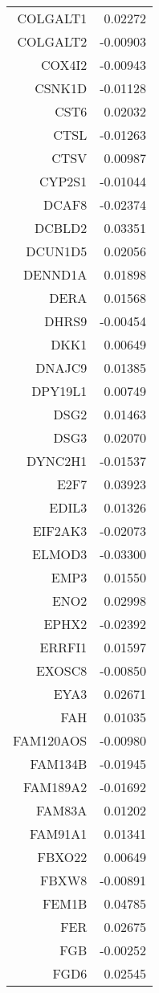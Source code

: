 \begin{longtable}{rr}
  COLGALT1 & 0.02272 \\ 
  COLGALT2 & -0.00903 \\ 
  COX4I2 & -0.00943 \\ 
  CSNK1D & -0.01128 \\ 
  CST6 & 0.02032 \\ 
  CTSL & -0.01263 \\ 
  CTSV & 0.00987 \\ 
  CYP2S1 & -0.01044 \\ 
  DCAF8 & -0.02374 \\ 
  DCBLD2 & 0.03351 \\ 
  DCUN1D5 & 0.02056 \\ 
  DENND1A & 0.01898 \\ 
  DERA & 0.01568 \\ 
  DHRS9 & -0.00454 \\ 
  DKK1 & 0.00649 \\ 
  DNAJC9 & 0.01385 \\ 
  DPY19L1 & 0.00749 \\ 
  DSG2 & 0.01463 \\ 
  DSG3 & 0.02070 \\ 
  DYNC2H1 & -0.01537 \\ 
  E2F7 & 0.03923 \\ 
  EDIL3 & 0.01326 \\ 
  EIF2AK3 & -0.02073 \\ 
  ELMOD3 & -0.03300 \\ 
  EMP3 & 0.01550 \\ 
  ENO2 & 0.02998 \\ 
  EPHX2 & -0.02392 \\ 
  ERRFI1 & 0.01597 \\ 
  EXOSC8 & -0.00850 \\ 
  EYA3 & 0.02671 \\ 
  FAH & 0.01035 \\ 
  FAM120AOS & -0.00980 \\ 
  FAM134B & -0.01945 \\ 
  FAM189A2 & -0.01692 \\ 
  FAM83A & 0.01202 \\ 
  FAM91A1 & 0.01341 \\ 
  FBXO22 & 0.00649 \\ 
  FBXW8 & -0.00891 \\ 
  FEM1B & 0.04785 \\ 
  FER & 0.02675 \\ 
  FGB & -0.00252 \\ 
  FGD6 & 0.02545 \\ 

\end{longtable}
